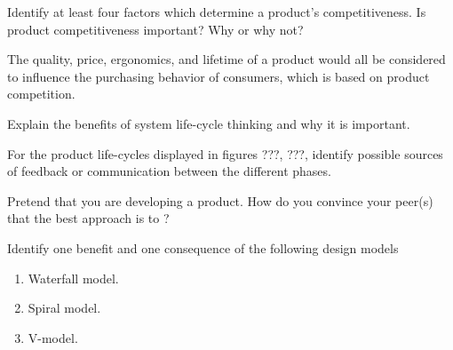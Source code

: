 \begin{exercises}
    \begin{exercise} 
    \label{sea-2-9}
        Identify at least four factors which determine a product's competitiveness. Is product competitiveness important? Why or why not?
    \end{exercise}
    \begin{solution}
        The quality, price, ergonomics, and lifetime of a product would all be considered to influence the purchasing behavior of consumers, which is based on product competition.
    \end{solution}
    
    \begin{exercise}
    \label{sea-2-10}
        Explain the benefits of system life-cycle thinking and why it is important. 
    \end{exercise}
    \begin{solution}
    \end{solution}
    
    \begin{exercise}
    \label{sea-2-11}
        For the product life-cycles displayed in figures ???, ???, identify possible sources of feedback or communication between the different phases.
    \end{exercise}
    \begin{solution}
    \end{solution}
    
    \begin{exercise}
    \label{sea-2-12}
        Pretend that you are developing a product. How do you convince your peer(s) that the best approach is to ?
    \end{exercise}
    \begin{solution}
    \end{solution}
    
    \begin{exercise}
    \label{sea-2-14} 
        Identify one benefit and one consequence of the following design models
        \begin{enumerate}[label=\alph*)]
            \item Waterfall model.
            \item Spiral model.
            \item V-model.
        \end{enumerate}
    \end{exercise}
    \begin{solution}
    \end{solution}
    

\end{exercises}
